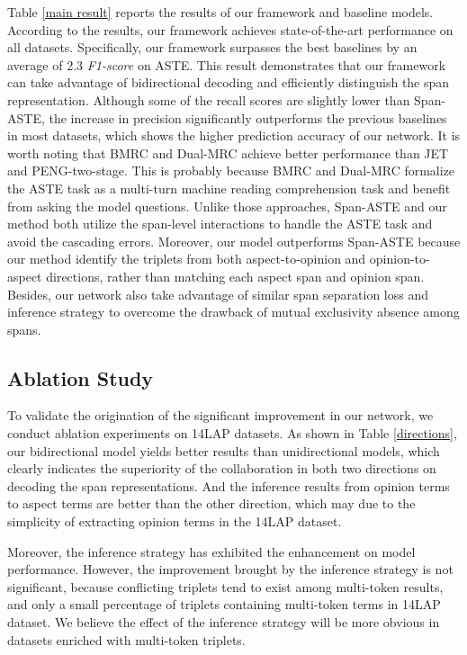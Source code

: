 \documentclass[11pt]{article}
\begin{document}
Table \ref{main result} reports the results of our framework and baseline models. According to the results, our framework achieves state-of-the-art performance on all datasets. Specifically, our framework surpasses the best baselines by an average of 2.3 \emph{F1-score} on ASTE. This result demonstrates that our framework can take advantage of bidirectional decoding and efficiently distinguish the span representation. Although some of the recall scores are slightly lower than Span-ASTE, the increase in precision significantly outperforms the previous baselines in most datasets, which shows the higher prediction accuracy of our network. It is worth noting that BMRC and Dual-MRC achieve better performance than JET and PENG-two-stage. This is probably because BMRC and Dual-MRC formalize the ASTE task as a multi-turn machine reading comprehension task and benefit from asking the model questions. Unlike those approaches, Span-ASTE and our method both utilize the span-level interactions to handle the ASTE task and avoid the cascading errors. Moreover, our model outperforms Span-ASTE because our method identify the triplets from both aspect-to-opinion and opinion-to-aspect directions, rather than matching each aspect span and opinion span.  Besides, our network also take advantage of similar span separation loss and inference strategy to overcome the drawback of mutual exclusivity absence among spans.
\subsection{Ablation Study} \label{Ablation Study} 

To validate the origination of the significant improvement in our network, we conduct ablation experiments on 14LAP datasets. As shown in Table \ref{directions}, our bidirectional model yields better results than unidirectional models, which clearly indicates the superiority of the collaboration in both two directions on decoding the span representations. And the inference results from opinion terms to aspect terms are better than the other direction, which may due to the simplicity of extracting opinion terms in the 14LAP dataset. 

Moreover, the inference strategy has exhibited the enhancement on model performance. However, the improvement brought by the inference strategy is not significant, because conflicting triplets tend to exist among multi-token results, and only a small percentage of triplets containing multi-token terms in 14LAP dataset. We believe the effect of the inference strategy will be more obvious in datasets enriched with multi-token triplets.
\end{document}
